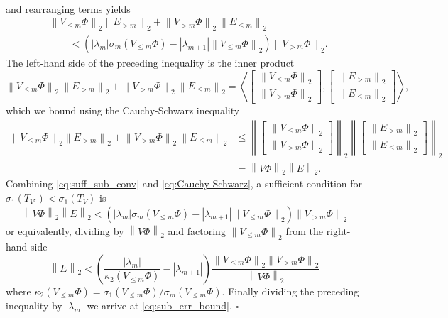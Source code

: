 \documentclass[10pt,preprint]{elsarticle}
\newenvironment{proof}{{\noindent \bf \em Proof:}}{\hfill$\square$}
\newcommand{\norm}[1]{\left \lVert #1 \right \rVert }
\begin{document}
\begin{proof}
\begin{equation}
\begin{aligned}
\end{aligned}
\end{equation}
and rearranging terms yields 
\begin{equation} \label{eq:suff_sub_conv}
\begin{aligned}
& \norm{V_{\leq m} \Phi}_2 \norm{E_{> m}}_2 + \norm{V_{>m} \Phi}_2 \ \norm{E_{\leq m}}_2 \\
&\qquad < \left(|\lambda_{m}| \sigma_m(V_{\leq m} \Phi) - |\lambda_{m+1}|\norm{V_{\leq m} \Phi}_2 \right) \norm{V_{>m} \Phi}_2. 
\end{aligned}
\end{equation}
The left-hand side of the preceding inequality is the inner product 
$$
\norm{V_{\leq m} \Phi}_2 \ \norm{E_{>m}}_2 + \norm{V_{>m} \Phi}_2 \ \norm{E_{\leq m}}_2 
= 
\left\langle \begin{bmatrix}
\norm{V_{\leq m} \Phi}_2 \\ \norm{V_{>m} \Phi}_2
    \end{bmatrix}
,
    \begin{bmatrix}
    \norm{E_{>m}}_2 \\ \norm{E_{\leq m}}_2
    \end{bmatrix} 
\right\rangle,
$$
which we bound using the Cauchy-Schwarz inequality
\begin{equation} \label{eq:Cauchy-Schwarz} 
\begin{aligned}
\norm{V_{\leq m} \Phi}_2 \norm{E_{>m}}_2 + \norm{V_{>m} \Phi}_2 \ \norm{E_{\leq m}}_2  &\leq
\norm{ 
    \begin{bmatrix}
    \norm{V_{\leq m} \Phi}_2 \\ \norm{V_{>m}\Phi}_2
    \end{bmatrix}
}_2 
\norm{ 
    \begin{bmatrix}
    \norm{E_{>m}}_2 \\ \norm{E_{\leq m}}_2
    \end{bmatrix}
}_2 \\ 
&= \norm{V \Phi}_2 \norm{E}_2. 
\end{aligned}    
\end{equation}
Combining \eqref{eq:suff_sub_conv} and \eqref{eq:Cauchy-Schwarz}, a sufficient condition for $\sigma_1(T_{V'})<\sigma_1(T_V)$ is 
$$
\norm{V \Phi}_2\norm{E}_2 < \left(|\lambda_m| \sigma_m(V_{\leq m} \Phi) - |\lambda_{m+1}| \norm{V_{\leq m} \Phi}_2\right) \norm{V_{>m} \Phi}_2  
$$
or equivalently, dividing by $\norm{V \Phi}_2$ and factoring $\norm{V_{\leq m} \Phi}_2$ from the right-hand side 
\begin{equation}
\norm{E}_2 < \left(\frac{|\lambda_m|}{\kappa_2(V_{\leq m} \Phi)} - |\lambda_{m+1}|\right) \frac{\norm{V_{\leq m} \Phi}_2 \norm{V_{>m} \Phi}_2}{\norm{V \Phi}_2}
\label{bnd:subspace-single-step}
\end{equation}
where $\kappa_2(V_{\leq m} \Phi) = \sigma_1(V_{\leq m} \Phi) / \sigma_m(V_{\leq m} \Phi)$. Finally dividing the preceding inequality by $|\lambda_{m}|$ we arrive at \eqref{eq:sub_err_bound}. 
\end{proof}
\end{document}
